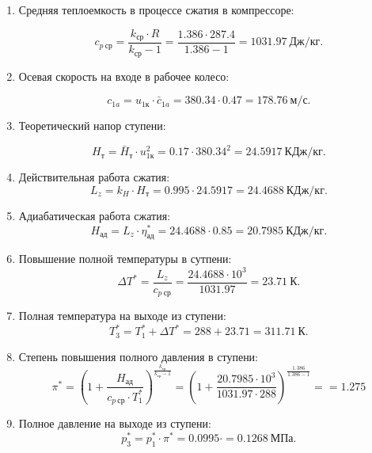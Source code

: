 \documentclass[a4paper,12pt]{article}
\begin{document}
    \begin{enumerate}

        \item Средняя теплоемкость в процессе сжатия в компрессоре:

        \[
        	c_{p\ ср} = \frac{k_{ср} \cdot R}{k_{ср} - 1} = 
        	\frac{1.386 \cdot 287.4 }{ 1.386 - 1 } =
			1031.97\ Дж/кг.
        \]
		
		\item Осевая скорость на входе в рабочее колесо:
		
		\[
			c_{1a} = u_{1к} \cdot \bar{c}_{1a} = 
			380.34 \cdot 0.47 = 178.76\ м/с.
		\]

        \item Теоретический напор ступени:

        \[
            H_т = \bar{H}_т \cdot u_{1к}^2 = 
            0.17 \cdot 380.34^2 = 
            24.5917\ КДж/кг.
        \]

        \item Действительная работа сжатия:
        \[
            L_z = k_H \cdot H_т = 0.995 \cdot 24.5917 = 
            24.4688\ КДж/кг.
        \]

        \item Адиабатическая работа сжатия:
        \[
            H_{ад} = L_z \cdot \eta_{ад}^* = 
            24.4688 \cdot 0.85 =
            20.7985\ КДж/кг.
        \]

        \item Повышение полной температуры в сутпени:
        \[
            \Delta T^* = \frac{L_z}{c_{p\ ср}} = 
            \frac{ 24.4688 \cdot 10^3 }{ 1031.97 } = 
            23.71\ К.
        \]

        \item Полная температура на выходе из ступени:
        \[
            T_3^* = T_1^* + \Delta T^* = 
            288 + 23.71 = 
            311.71\ К.
        \]

        \item Степень повышения полного давления в ступени:
        \[
            \pi^* = \left( 1 + \frac{ H_{ад} }{ c_{p\ ср} \cdot T_1^* } \right) ^ { \frac{ k_{ср} }{ k_{ср} - 1 } } = 
            \left( 
                1 + \frac{ 20.7985 \cdot 10^3 
                        }{ 1031.97 \cdot 288 } 
            \right) ^ 
            { \frac{ 1.386 }{ 1.386 - 1 } } =
            = 1.275
        \]

        \item Полное давление на выходе из ступени:
        \[
            p_3^* = p_1^* \cdot \pi^* = 
            0.0995 \cdot  = 
            0.1268\ МПа.
        \]


\end{enumerate}
\end{document}
